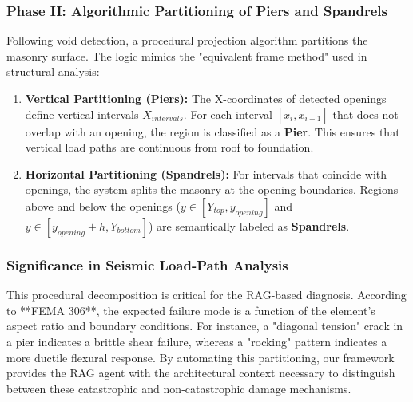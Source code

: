 \subsubsection{Phase II: Algorithmic Partitioning of Piers and Spandrels}
\begin{sloppypar}
Following void detection, a procedural projection algorithm partitions the masonry surface. The logic mimics the "equivalent frame method" used in structural analysis:
\end{sloppypar}

\begin{enumerate}[leftmargin=*,itemsep=1pt]
    \item \textbf{Vertical Partitioning (Piers):} The X-coordinates of detected openings define vertical intervals $X_{intervals}$. For each interval $[x_i, x_{i+1}]$ that does not overlap with an opening, the region is classified as a \textbf{Pier}. This ensures that vertical load paths are continuous from roof to foundation.
    \item \textbf{Horizontal Partitioning (Spandrels):} For intervals that coincide with openings, the system splits the masonry at the opening boundaries. Regions above and below the openings ($y \in [Y_{top}, y_{opening}]$ and $y \in [y_{opening}+h, Y_{bottom}]$) are semantically labeled as \textbf{Spandrels}.
\end{enumerate}

\subsubsection{Significance in Seismic Load-Path Analysis}
\begin{sloppypar}
This procedural decomposition is critical for the RAG-based diagnosis. According to **FEMA 306**, the expected failure mode is a function of the element's aspect ratio and boundary conditions. For instance, a "diagonal tension" crack in a pier indicates a brittle shear failure, whereas a "rocking" pattern indicates a more ductile flexural response. By automating this partitioning, our framework provides the RAG agent with the architectural context necessary to distinguish between these catastrophic and non-catastrophic damage mechanisms.
\end{sloppypar}
